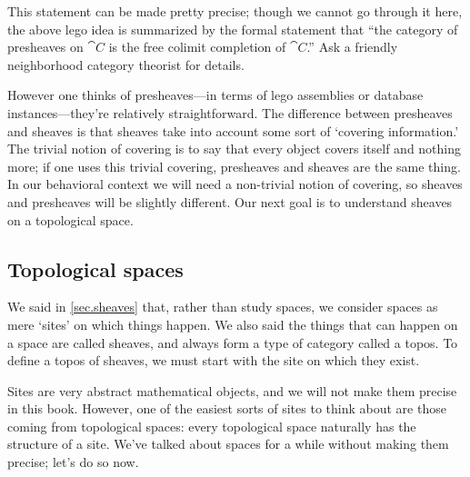 \documentclass[7Sketches]{subfiles}
\begin{document}
\begin{example}
This statement can be made pretty precise; though we cannot go through it here,
the above lego idea is summarized by the formal statement that ``the category of
presheaves on $\cat{C}$ is the free colimit completion of
$\cat{C}$.''%
 Ask a friendly neighborhood category theorist for details.%
\end{example}

However one thinks of presheaves---in terms of lego assemblies or database instances---they're relatively straightforward. The difference between presheaves and sheaves is that sheaves take into account some sort of `covering information.' The trivial notion of covering is to say that every object covers itself and nothing more; if one uses this trivial covering, presheaves and sheaves are the same thing. In our behavioral context we will need a non-trivial notion of covering, so sheaves and presheaves will be slightly different. Our next goal is to understand sheaves on a topological space.%


%

\subsection{Topological spaces} %
\label{subsec.topology}%
We said in \cref{sec.sheaves} that, rather than study spaces, we consider spaces
as mere `sites' on which things happen. We also said the things that can
happen on a space are called sheaves, and always form a type of category called
a topos. To define a topos of sheaves, we must start with the site on which they
exist.

Sites are very abstract mathematical objects, and we will not make them precise
in this book. However, one of the easiest sorts of sites to think about are
those coming from topological spaces: every topological space naturally has the
structure of a site. We've talked about spaces for a while without making them
precise; let's do so now.%
\end{document}
